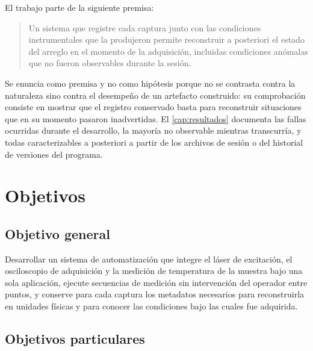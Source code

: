 El trabajo parte de la siguiente premisa:

\begin{quote}
Un sistema que registre cada captura junto con las condiciones
instrumentales que la produjeron permite reconstruir a posteriori el
estado del arreglo en el momento de la adquisición, incluidas
condiciones anómalas que no fueron observables durante la sesión.
\end{quote}

Se enuncia como premisa y no como hipótesis porque no se contrasta
contra la naturaleza sino contra el desempeño de un artefacto
construido: su comprobación consiste en mostrar que el registro
conservado basta para reconstruir situaciones que en su momento pasaron
inadvertidas. El \cref{cap:resultados} documenta las fallas ocurridas
durante el desarrollo, la mayoría no observable mientras transcurría,
y todas caracterizables a posteriori a partir de los archivos de sesión
o del historial de versiones del programa.

\section{Objetivos}
\label{sec:objetivos}

\subsection*{Objetivo general}

Desarrollar un sistema de automatización que integre el láser de
excitación, el osciloscopio de adquisición y la medición de temperatura
de la muestra bajo una sola aplicación, ejecute secuencias de medición
sin intervención del operador entre puntos, y conserve para cada
captura los metadatos necesarios para reconstruirla en unidades físicas
y para conocer las condiciones bajo las cuales fue adquirida.

\subsection*{Objetivos particulares}

